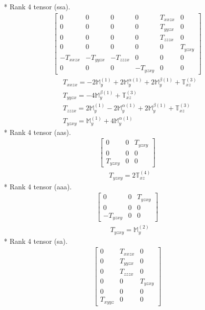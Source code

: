 \documentclass[fleqn,8pt,landscape]{jsarticle}
\begin{document}
* Rank 4 tensor (ssa).
\begin{align*}
\begin{bmatrix} 0 & 0 & 0 & 0 & T_{xxzx} & 0 \\ 0 & 0 & 0 & 0 & T_{yyzx} & 0 \\ 0 & 0 & 0 & 0 & T_{zzzx} & 0 \\ 0 & 0 & 0 & 0 & 0 & T_{yzxy} \\ - T_{xxzx} & - T_{yyzx} & - T_{zzzx} & 0 & 0 & 0 \\ 0 & 0 & 0 & - T_{yzxy} & 0 & 0 \end{bmatrix}
\end{align*}
\begin{align*}
& T_{xxzx} = - 2 \mathbb{M}_{y}^{(1)} + 2 \mathbb{M}_{y}^{\alpha(1)} + 2 \mathbb{M}_{y}^{\beta(1)} + \mathbb{T}_{xz}^{(3)} \\
& T_{yyzx} = - 4 \mathbb{M}_{y}^{\beta(1)} + \mathbb{T}_{xz}^{(3)} \\
& T_{zzzx} = 2 \mathbb{M}_{y}^{(1)} - 2 \mathbb{M}_{y}^{\alpha(1)} + 2 \mathbb{M}_{y}^{\beta(1)} + \mathbb{T}_{xz}^{(3)} \\
& T_{yzxy} = \mathbb{M}_{y}^{(1)} + 4 \mathbb{M}_{y}^{\alpha(1)}
\end{align*}
* Rank 4 tensor (aas).
\begin{align*}
\begin{bmatrix} 0 & 0 & T_{yzxy} \\ 0 & 0 & 0 \\ T_{yzxy} & 0 & 0 \end{bmatrix}
\end{align*}
\begin{align*}
& T_{yzxy} = 2 \mathbb{T}_{xz}^{(4)}
\end{align*}
* Rank 4 tensor (aaa).
\begin{align*}
\begin{bmatrix} 0 & 0 & T_{yzxy} \\ 0 & 0 & 0 \\ - T_{yzxy} & 0 & 0 \end{bmatrix}
\end{align*}
\begin{align*}
& T_{yzxy} = \mathbb{M}_{y}^{(2)}
\end{align*}
* Rank 4 tensor (sa).
\begin{align*}
\begin{bmatrix} 0 & T_{xxzx} & 0 \\ 0 & T_{yyzx} & 0 \\ 0 & T_{zzzx} & 0 \\ 0 & 0 & T_{yzxy} \\ 0 & 0 & 0 \\ T_{xyyz} & 0 & 0 \end{bmatrix}
\end{align*}
\end{document}

